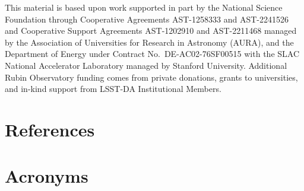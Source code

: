 \documentclass[SE,lsstdraft,authoryear,toc]{lsstdoc}
\begin{document}
This material is based upon work supported in part by the National Science Foundation through Cooperative Agreements AST-1258333 and AST-2241526 and Cooperative Support Agreements AST-1202910 and AST-2211468 managed by the Association of Universities for Research in Astronomy (AURA), and the Department of Energy under Contract No.\ DE-AC02-76SF00515 with the SLAC National Accelerator Laboratory managed by Stanford University.
Additional Rubin Observatory funding comes from private donations, grants to universities, and in-kind support from LSST-DA Institutional Members.

\section{References} \label{sec:bib}
\renewcommand{\refname}{} %


\section{Acronyms} \label{sec:acronyms}

\end{document}
